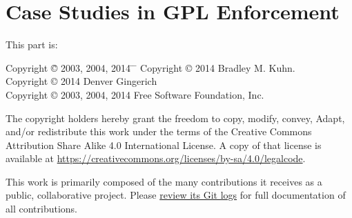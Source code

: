 





\part{Case Studies in GPL Enforcement}

{\parindent 0in
This part is: \\
\begin{tabbing}
Copyright \= \copyright{} 2003, 2004, 2014 \hspace{1mm} \= \hspace{1.mm} \=  \kill
Copyright \> \copyright{} 2014 \>  Bradley M. Kuhn. \\
Copyright \> \copyright{} 2014 \>  Denver Gingerich \\
Copyright \> \copyright{} 2003, 2004, 2014 \> Free Software Foundation, Inc. \\
\end{tabbing}

\vspace{.2in}

\begin{center}

The copyright holders hereby grant the freedom to copy, modify, convey,
Adapt, and/or redistribute this work under the terms of the Creative Commons
Attribution Share Alike 4.0 International License.  A copy of that license is
available at \url{https://creativecommons.org/licenses/by-sa/4.0/legalcode}.
\end{center}

\vfill

This work is primarily composed of the many contributions it
receives as a public, collaborative project.  Please
\href{https://gitorious.org/copyleft-org/tutorial/history/master:enforcement-case-studies.tex}{review
  its Git logs} for full documentation of all contributions.


}

